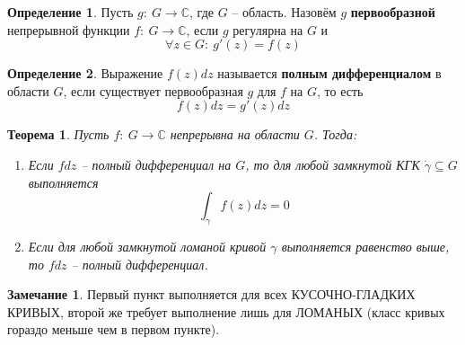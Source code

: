 \documentclass[a4paper,12pt]{article}
\theoremstyle{plain}
\newtheorem{theorem}{Теорема}[section]
\theoremstyle{definition}
\newtheorem{definition}{Определение}[section]
\newtheorem*{note}{Замечание}
\theoremstyle{remark}
\begin{document}
\begin{definition}
	Пусть $g :\: G \to \mathbb{C}$, где $G$ -- область. Назовём $g$ \textbf{первообразной} непрерывной функции $f :\: G \to \mathbb{C}$, если $g$ регулярна на $G$ и
	\[
		\forall z \in G :\: g'(z) = f(z)
	\]
\end{definition}

\begin{definition}
	Выражение $f(z)dz$ называется \textbf{полным дифференциалом} в области $G$, если существует первообразная $g$ для $f$ на $G$, то есть
	\[
		f(z)dz = g'(z)dz
	\]
\end{definition}

\begin{theorem}
	Пусть $f :\: G \to \mathbb{C}$ непрерывна на области $G$. Тогда:
	\begin{enumerate}
		\item Если $fdz$ -- полный дифференциал на $G$, то для любой замкнутой КГК $\dot{\gamma} \subseteq G$ выполняется
		      \[
			      \int_{\dot{\gamma}}f(z)dz = 0
		      \]
		\item Если для любой замкнутой ломаной кривой $\gamma$ выполняется равенство выше, то $fdz$ -- полный дифференциал.
	\end{enumerate}
\end{theorem}

\begin{note}
	Первый пункт выполняется для всех КУСОЧНО-ГЛАДКИХ КРИВЫХ, второй же требует выполнение лишь для ЛОМАНЫХ (класс кривых гораздо меньше чем в первом пункте).
\end{note}
\end{document}
